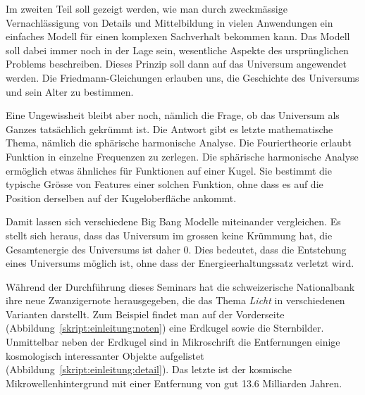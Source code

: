Im zweiten Teil soll gezeigt werden, wie man durch zweckmässige
Vernachlässigung von Details und Mittelbildung in vielen Anwendungen
ein einfaches Modell für einen komplexen Sachverhalt bekommen kann.
Das Modell soll dabei immer noch in der Lage sein, wesentliche
Aspekte des ursprünglichen Problems beschreiben.
Dieses Prinzip soll dann auf das Universum angewendet werden.
Die Friedmann-Gleichungen erlauben uns, die Geschichte des
Universums und sein Alter zu bestimmen.

Eine Ungewissheit bleibt aber noch, nämlich die Frage, ob das
Universum als Ganzes tatsächlich gekrümmt ist.
Die Antwort gibt es letzte mathematische Thema, nämlich die
sphärische harmonische Analyse.
Die Fouriertheorie erlaubt Funktion in einzelne Frequenzen zu
zerlegen.
Die sphärische harmonische Analyse ermöglich etwas ähnliches
für Funktionen auf einer Kugel. 
Sie bestimmt die typische Grösse von Features einer solchen
Funktion, ohne dass es auf die Position derselben auf der Kugeloberfläche
ankommt.

Damit lassen sich verschiedene Big Bang Modelle miteinander
vergleichen.
Es stellt sich heraus, dass das Universum im grossen keine Krümmung hat,
die Gesamtenergie des Universums ist daher $0$.
Dies bedeutet, dass die Entstehung eines Universums möglich ist,
ohne dass der Energieerhaltungssatz verletzt wird.

Während der Durchführung dieses Seminars hat die schweizerische
Nationalbank ihre neue Zwanzigernote herausgegeben, die das Thema
{\em Licht} in verschiedenen Varianten darstellt.
Zum Beispiel findet man auf der Vorderseite
(Abbildung~\ref{skript:einleitung:noten})
eine Erdkugel sowie die Sternbilder. 
Unmittelbar neben der Erdkugel sind in Mikroschrift die Entfernungen
einige kosmologisch interessanter Objekte aufgelistet
(Abbildung~\ref{skript:einleitung:detail}).
Das letzte ist der kosmische Mikrowellenhintergrund mit einer Entfernung
von gut 13.6 Milliarden Jahren.

